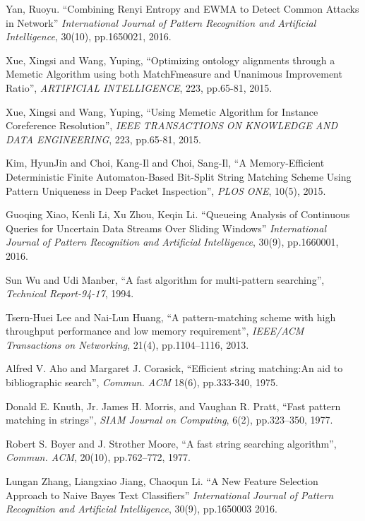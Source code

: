 \documentclass{ws-ijprai}
\begin{document}
\begin{thebibliography}{99}

 Yan, Ruoyu. ``Combining Renyi Entropy and EWMA to
  Detect Common Attacks in Network'' {\it International Journal of
    Pattern Recognition and Artificial Intelligence}, 30(10),
  pp.1650021, 2016.


 Xue, Xingsi and Wang, Yuping, ``Optimizing ontology
  alignments through a Memetic Algorithm using both MatchFmeasure and
  Unanimous Improvement Ratio'', {\it ARTIFICIAL INTELLIGENCE}, 223,
  pp.65-81, 2015.

 Xue, Xingsi and Wang, Yuping, ``Using Memetic
  Algorithm for Instance Coreference Resolution'', {\it IEEE
    TRANSACTIONS ON KNOWLEDGE AND DATA ENGINEERING}, 223, pp.65-81,
  2015.

 Kim, HyunJin and Choi, Kang-Il and Choi, Sang-Il,
  ``A Memory-Efficient Deterministic Finite Automaton-Based Bit-Split
  String Matching Scheme Using Pattern Uniqueness in Deep Packet
  Inspection'', {\it PLOS ONE}, 10(5), 2015.


 Guoqing Xiao, Kenli Li, Xu Zhou, Keqin
  Li. ``Queueing Analysis of Continuous Queries for Uncertain Data
  Streams Over Sliding Windows'' {\it International Journal of Pattern
    Recognition and Artificial Intelligence}, 30(9), pp.1660001, 2016.

 Sun Wu and Udi Manber, ``A fast algorithm for
  multi-pattern searching'', {\it Technical Report-94-17}, 1994.

 Tsern-Huei Lee and Nai-Lun Huang, ``A
  pattern-matching scheme with high throughput performance and low
  memory requirement'', {\it IEEE/ACM Transactions on Networking},
  21(4), pp.1104--1116, 2013.

 Alfred V. Aho and Margaret J. Corasick, ``Efficient
  string matching:An aid to bibliographic search'', {\it Commun. ACM}
  18(6), pp.333-340, 1975.

 Donald E. Knuth, Jr. James H. Morris, and Vaughan
  R. Pratt, ``Fast pattern matching in strings'', {\it SIAM Journal on
    Computing}, 6(2), pp.323–350, 1977.

 Robert S. Boyer and J. Strother Moore, ``A fast
  string searching algorithm'', {\it Commun. ACM}, 20(10), pp.762–772,
  1977.

 Lungan Zhang, Liangxiao Jiang, Chaoqun Li. ``A New
  Feature Selection Approach to Naive Bayes Text Classifiers'' {\it
    International Journal of Pattern Recognition and Artificial
    Intelligence}, 30(9), pp.1650003 2016.


\end{thebibliography}
\end{document}
